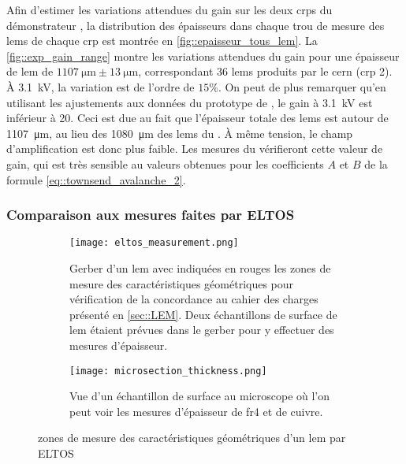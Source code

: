         Afin d'estimer les variations attendues du gain sur les deux \glspl{crp} du démonstrateur \SSS{}, la distribution des épaisseurs dans chaque trou de mesure des \glspl{lem} de chaque \gls{crp} est montrée en \autoref{fig::epaisseur_tous_lem}. La \autoref{fig::exp_gain_range} montre les variations attendues du gain pour une épaisseur de \gls{lem} de $\SI{1107}{\micro\meter}\pm\SI{13}{\micro\meter}$, correspondant 36 \glspl{lem} produits par le \gls{cern} (\gls{crp} 2). À \SI{3.1}{\kilo\volt}, la variation est de l'ordre de $15\%$. On peut de plus remarquer qu'en utilisant les ajustements aux données du prototype de \threeL{}, le gain à \SI{3.1}{\kilo\volt} est inférieur à 20. Ceci est due au fait que l'épaisseur totale des \glspl{lem} est autour de \SI{1107}{\micro\meter}, au lieu des \SI{1080}{\micro\meter} des \glspl{lem} du \threeL{}. À même tension, le champ d'amplification est donc plus faible. Les mesures du \SSS{} vérifieront cette valeur de gain, qui est très sensible au valeurs obtenues pour les coefficients $A$ et $B$ de la formule \eqref{eq::townsend_avalanche_2}.
                
                
      \subsubsection{Comparaison aux mesures faites par ELTOS}\label{sec::thickness_comparison_eltos}
            
        \begin{figure}[htpb]
          \begin{subfigure}[t]{0.68\textwidth}
            \texttt{[image: eltos\_measurement.png]}
            \caption{Gerber d'un \gls{lem} avec indiquées en rouges les zones de mesure des caractéristiques géométriques pour vérification de la concordance au cahier des charges présenté en \autoref{sec::LEM}. Deux échantillons de surface de \gls{lem} étaient prévues dans le gerber pour y effectuer des mesures d'épaisseur.}
          \end{subfigure}
          \hfill
          \begin{subfigure}[t]{0.3\textwidth}
            \texttt{[image: microsection\_thickness.png]}
            \caption{\label{fig::microsection}Vue d'un échantillon de surface au microscope où l'on peut voir les mesures d'épaisseur de \gls{fr4} et de cuivre.}
          \end{subfigure}
          \caption[zones de mesure des caractéristiques géométriques d'un \gls{lem}]{\label{fig::mesures_eltos}zones de mesure des caractéristiques géométriques d'un \gls{lem} par ELTOS}
        \end{figure}
            
